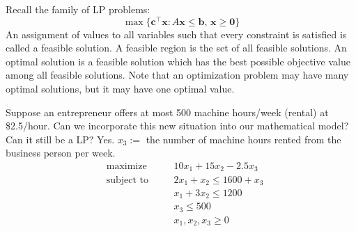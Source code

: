 Recall the family of LP problems:
\[\max \{\bm{c}^\top \bm{x} : A\bm{x}\leqslant \bm{b},\,\bm{x}\geqslant  \bm{0}\} \]
An assignment of values to all variables such that every
constraint is satisfied is called a feasible solution.
A feasible region is the set of all feasible solutions.
An optimal solution is a feasible solution which has the best
possible objective value among all feasible solutions.
Note that an optimization problem may have many optimal
solutions, but it may have one optimal value.

\begin{exbox}
    \begin{example}
        Suppose an entrepreneur offers at most 500 machine hours/week
        (rental) at \$2.5/hour. Can we incorporate this new situation
        into our mathematical model? Can it still be a LP\@? Yes.
        $x_3:=$ the number of machine hours rented from the business
        person per week.
        \begin{equation}
            \begin{aligned}
                 & \text{maximize}   & \quad & 10x_1+15x_2-2.5x_3         \\
                 & \text{subject to} &       & 2x_1+x_2\leqslant 1600+x_3 \\
                 &                   &       & x_1+3x_2\leqslant 1200     \\
                 &                   &       & x_3\leqslant 500           \\
                 &                   &       & x_1,x_2,x_3\geqslant  0    \\
            \end{aligned}\tag{LP}
        \end{equation}
    \end{example}
\end{exbox}
